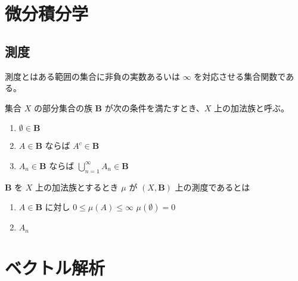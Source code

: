 \documentclass[uplatex,dvipdfmx,a4paper,11pt]{jlreq}
\theoremstyle{definition}
\begin{document}
\section{微分積分学}
\subsection{測度}
測度とはある範囲の集合に非負の実数あるいは $\infty$ を対応させる集合関数である。
\begin{definition}[加法族]
  集合 $X$ の部分集合の族 $\bm{B}$ が次の条件を満たすとき、$X$ 上の加法族と呼ぶ。
  \begin{enumerate}
    \item $\emptyset\in\bm{B}$
    \item $A\in\bm{B}$ ならば $A^c\in\bm{B}$
    \item $A_n\in\bm{B}$ ならば $\bigcup_{n=1}^\infty A_n\in\bm{B}$
  \end{enumerate}
\end{definition}
\begin{definition}[測度]
  $\bm{B}$ を $X$ 上の加法族とするとき $\mu$ が $(X, \bm{B})$ 上の測度であるとは
  \begin{enumerate}
    \item $A\in\bm{B}$ に対し $0\leq \mu(A)\leq\infty$ $\mu(\emptyset) = 0$
    \item $A_n$
  \end{enumerate}
\end{definition}

\section{ベクトル解析}
\end{document}
